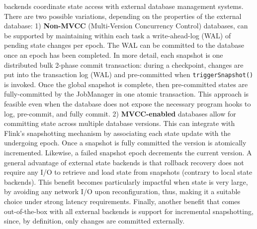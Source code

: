  backends coordinate state access with external database management systems. There are two possible variations, depending on the properties of the external database: 1) \textbf{Non-MVCC} (Multi-Version Concurrency Control) databases, can be supported by maintaining within each task a write-ahead-log (WAL) of pending state changes per epoch. The WAL can be committed to the database once an epoch has been completed. In more detail, each snapshot is one distributed bulk 2-phase commit transaction: during a checkpoint, changes are put into the transaction log (WAL) and pre-committed when \texttt{triggerSnapshot()} is invoked. Once the global snapshot is complete, then pre-committed states are fully-committed by the JobManager in one atomic transaction. This approach is feasible even when the database does not expose the necessary program hooks to log, pre-commit, and fully commit.
 2) \textbf{MVCC-enabled} databases allow for committing state across multiple database versions. This can integrate with Flink's snapshotting mechanism by associating each state update with the undergoing epoch. Once a snapshot is fully committed the version is atomically incremented. Likewise, a failed snapshot epoch decrements the current version. A general advantage of external state backends is that rollback recovery does not require any I/O to retrieve and load state from snapshots (contrary to local state backends). This benefit becomes particularly impactful when state is very large, by avoiding any network I/O upon reconfiguration, thus, making it a suitable choice under strong latency requirements. Finally, another benefit that comes out-of-the-box with all external backends is support for incremental snapshotting, since, by definition, only changes are committed externally.
 


